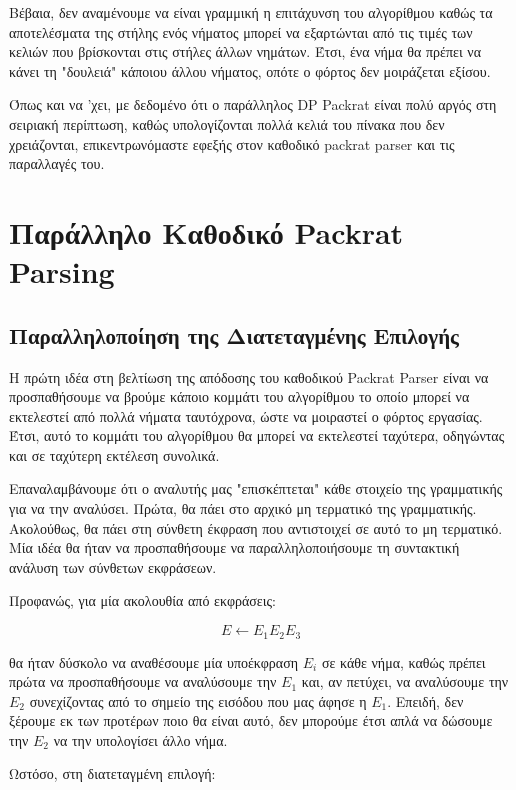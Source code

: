 Βέβαια, δεν αναμένουμε να είναι γραμμική η επιτάχυνση του αλγορίθμου καθώς τα αποτελέσματα της στήλης ενός νήματος μπορεί να εξαρτώνται από τις τιμές των κελιών που βρίσκονται στις στήλες άλλων νημάτων.
Έτσι, ένα νήμα θα πρέπει να κάνει τη "δουλειά" κάποιου άλλου νήματος, οπότε ο φόρτος δεν μοιράζεται εξίσου.

Όπως και να 'χει, με δεδομένο ότι ο παράλληλος DP Packrat είναι πολύ αργός στη σειριακή περίπτωση, καθώς υπολογίζονται πολλά κελιά του πίνακα που δεν χρειάζονται, επικεντρωνόμαστε εφεξής στον καθοδικό packrat parser και τις παραλλαγές του.

\section{Παράλληλο Καθοδικό Packrat Parsing}

\subsection{Παραλληλοποίηση της Διατεταγμένης Επιλογής}

Η πρώτη ιδέα στη βελτίωση της απόδοσης του καθοδικού Packrat Parser είναι να προσπαθήσουμε να βρούμε κάποιο κομμάτι του αλγορίθμου το οποίο μπορεί να εκτελεστεί από πολλά νήματα ταυτόχρονα, ώστε να μοιραστεί ο φόρτος εργασίας.
Έτσι, αυτό το κομμάτι του αλγορίθμου θα μπορεί να εκτελεστεί ταχύτερα, οδηγώντας και σε ταχύτερη εκτέλεση συνολικά.

Επαναλαμβάνουμε ότι ο αναλυτής μας "επισκέπτεται" κάθε στοιχείο της γραμματικής για να την αναλύσει.
Πρώτα, θα πάει στο αρχικό μη τερματικό της γραμματικής. 
Ακολούθως, θα πάει στη σύνθετη έκφραση που αντιστοιχεί σε αυτό το μη τερματικό.
Μία ιδέα θα ήταν να προσπαθήσουμε να παραλληλοποιήσουμε τη συντακτική ανάλυση των σύνθετων εκφράσεων.

Προφανώς, για μία ακολουθία από εκφράσεις:

\begin{equation}
	E \leftarrow E_1 E_2 E_3
\end{equation}

θα ήταν δύσκολο να αναθέσουμε μία υποέκφραση $E_i$ σε κάθε νήμα, καθώς πρέπει πρώτα να προσπαθήσουμε να αναλύσουμε την $E_1$ και, αν πετύχει, να αναλύσουμε την $E_2$ συνεχίζοντας από το σημείο της εισόδου που μας άφησε η $E_1$. 
Επειδή, δεν ξέρουμε εκ των προτέρων ποιο θα είναι αυτό, δεν μπορούμε έτσι απλά να δώσουμε την $E_2$ να την υπολογίσει άλλο νήμα.

Ωστόσο, στη διατεταγμένη επιλογή:

